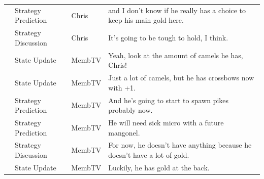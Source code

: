 {\begin{longtable}{@{}>{\theAppRow}r|L{2.3cm}L{1.0cm}U{11.55cm}@{}}
    & Strategy Prediction   & Chris        & and I don't know if he really has a choice to keep his main gold here.                                                                                                                                                                                           \\
    & Strategy Discussion      & Chris        & It's going to be tough to hold, I think.                                                                                                                                                                                                                         \\
    & State Update          & MembTV       & Yeah, look at the amount of camels he has, Chris!                                                                                                                                                                                                                \\
    & State Update          & MembTV       & Just a lot of camels, but he has crossbows now with +1.                                                                                                                                                                                                          \\
    & Strategy Prediction   & MembTV       & And he's going to start to spawn pikes probably now.                                                                                                                                                                                                             \\
    & Strategy Prediction   & MembTV       & He will need sick micro with a future mangonel.                                                                                                                                                                                                                  \\
    & Strategy Discussion   & MembTV       & For now, he doesn't have anything because he doesn't have a lot of gold.                                                                                                                                                                                         \\
    & State Update          & MembTV       & Luckily, he has gold at the back.                                                                                                                                                                                                                                \\

\end{longtable}}
